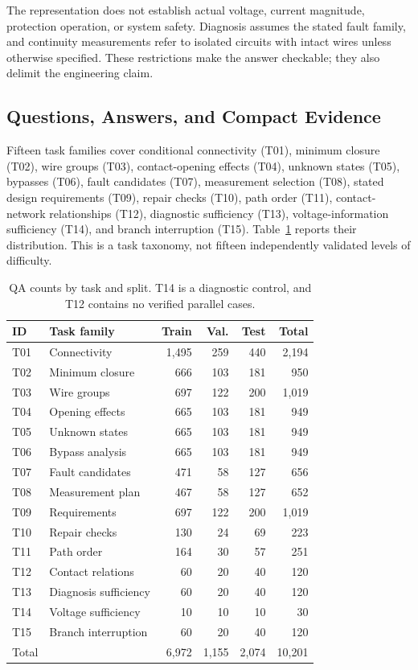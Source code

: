 The representation does not establish actual voltage, current magnitude, protection operation, or system safety. Diagnosis assumes the stated fault family, and continuity measurements refer to isolated circuits with intact wires unless otherwise specified. These restrictions make the answer checkable; they also delimit the engineering claim.

\subsection{Questions, Answers, and Compact Evidence}
Fifteen task families cover conditional connectivity (T01), minimum closure (T02), wire groups (T03), contact-opening effects (T04), unknown states (T05), bypasses (T06), fault candidates (T07), measurement selection (T08), stated design requirements (T09), repair checks (T10), path order (T11), contact-network relationships (T12), diagnostic sufficiency (T13), voltage-information sufficiency (T14), and branch interruption (T15). Table~\ref{tab:tasks} reports their distribution. This is a task taxonomy, not fifteen independently validated levels of difficulty.

\begin{table}[t]
\centering\small\setlength{\tabcolsep}{3pt}
\caption{QA counts by task and split. T14 is a diagnostic control, and T12 contains no verified parallel cases.}
\label{tab:tasks}
\begin{tabularx}{\linewidth}{@{}lXrrrr@{}}\toprule
ID & Task family & Train & Val. & Test & Total \\\midrule
T01 & Connectivity & 1,495 & 259 & 440 & 2,194 \\
T02 & Minimum closure & 666 & 103 & 181 & 950 \\
T03 & Wire groups & 697 & 122 & 200 & 1,019 \\
T04 & Opening effects & 665 & 103 & 181 & 949 \\
T05 & Unknown states & 665 & 103 & 181 & 949 \\
T06 & Bypass analysis & 665 & 103 & 181 & 949 \\
T07 & Fault candidates & 471 & 58 & 127 & 656 \\
T08 & Measurement plan & 467 & 58 & 127 & 652 \\
T09 & Requirements & 697 & 122 & 200 & 1,019 \\
T10 & Repair checks & 130 & 24 & 69 & 223 \\
T11 & Path order & 164 & 30 & 57 & 251 \\
T12 & Contact relations & 60 & 20 & 40 & 120 \\
T13 & Diagnosis sufficiency & 60 & 20 & 40 & 120 \\
T14 & Voltage sufficiency & 10 & 10 & 10 & 30 \\
T15 & Branch interruption & 60 & 20 & 40 & 120 \\
\midrule Total & & 6,972 & 1,155 & 2,074 & 10,201 \\
\bottomrule\end{tabularx}
\end{table}

